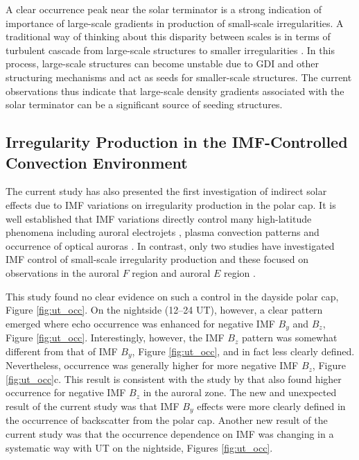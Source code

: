 A clear occurrence peak near the solar terminator is a strong indication of importance of large-scale gradients in production of small-scale irregularities. A traditional way of thinking about this disparity between scales is in terms of turbulent cascade from large-scale structures to smaller irregularities \citep{Tsunoda1988}. In this process, large-scale structures can become unstable due to GDI and other structuring mechanisms and act as seeds for smaller-scale structures. The current observations thus indicate that large-scale density gradients associated with the solar terminator can be a significant source of seeding structures.

\subsection{Irregularity Production in the IMF-Controlled Convection Environment}

The current study has also presented the first investigation of indirect solar effects due to IMF variations on irregularity production in the polar cap. It is well established that IMF variations directly control many high-latitude phenomena including auroral electrojets \citep[e.g.][]{McPherron1988}, plasma convection patterns \citep{Heelis1984,Ruohoniemi1996,Ridley1998,Pettigrew2010} and occurrence of optical auroras \citep{Ostgaard2004}. In contrast, only two studies have investigated IMF control of small-scale irregularity production and these focused on observations in the auroral \(F\) region \citep{Ballatore2001} and auroral \(E\) region \citep{Makarevich2012}.

This study found no clear evidence on such a control in the dayside polar cap, Figure \ref{fig:ut_occ}. On the nightside (12--24 UT), however, a clear pattern emerged where echo occurrence was enhanced for negative IMF \(B_y\) and \(B_z\), Figure \ref{fig:ut_occ}. Interestingly, however, the IMF \(B_z\) pattern was somewhat different from that of IMF \(B_y\), Figure \ref{fig:ut_occ}, and in fact less clearly defined. Nevertheless, occurrence was generally higher for more negative IMF \(B_z\), Figure \ref{fig:ut_occ}c. This result is consistent with the study by \citet{Ballatore2001} that also found higher occurrence for negative IMF \(B_z\) in the auroral zone. The new and unexpected result of the current study was that IMF \(B_y\) effects were more clearly defined in the occurrence of backscatter from the polar cap. Another new result of the current study was that the occurrence dependence on IMF was changing in a systematic way with UT on the nightside, Figures \ref{fig:ut_occ}.

